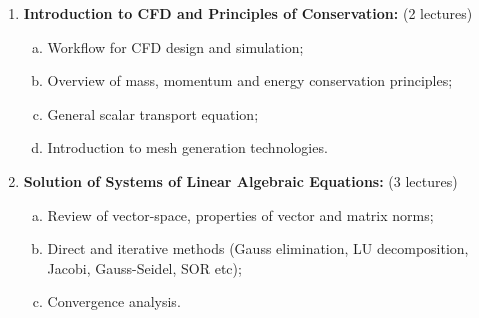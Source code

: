 \documentclass[12pts,a4paper,amsmath,amssymb,floatfix]{article}%
\begin{document}
\begin{enumerate}[{\bf Module 1}]
\item {\bf Introduction to CFD and Principles of Conservation:} (2 lectures)\label{Mod:Intro}
   \begin{enumerate}[(a)]
      \item Workflow for CFD design and simulation;
      \item Overview of mass, momentum and energy conservation principles;
      \item General scalar transport equation;
      \item Introduction to mesh generation technologies.
   \end{enumerate}

\begin{comment}
\item {\bf Basic Programming Concepts:} (2 lectures)\label{Mod:Programming}
  \begin{enumerate}[(a)]
       \item Source code, compilers and executables;
       \item Design and implementation of algorithms;
       \item Main programming structures: data types, operators, loops and conditionals;
       \item Arrays and arrays processing.
   \end{enumerate}
\end{comment}

\item {\bf Solution of Systems of Linear Algebraic Equations:} (3 lectures)\label{Mod:LinAlg}
   \begin{enumerate}[(a)]
      \item Review of vector-space, properties of vector and matrix norms;
      \item Direct and iterative methods (Gauss elimination, LU decomposition, Jacobi, Gauss-Seidel, SOR etc);
      \item Convergence analysis.
   \end{enumerate}


\end{enumerate}
\end{document}
